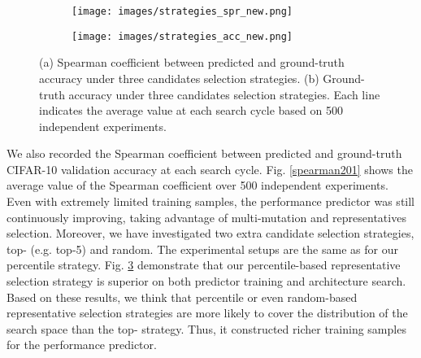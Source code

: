 \documentclass[sigconf]{acmart}
\begin{document}
\begin{figure}[!h]
\begin{subfigure}{.45\textwidth}
  \centering
  \texttt{[image: images/strategies\_spr\_new.png]}
  \caption{}
  \label{strategy_spr}
  \end{subfigure}
\begin{subfigure}{.45\textwidth}
  \centering
  \texttt{[image: images/strategies\_acc\_new.png]} 
  \caption{}
  \label{strategy_acc}
  \end{subfigure}
\caption{(a) Spearman coefficient between predicted and ground-truth accuracy under three candidates selection strategies. (b) Ground-truth accuracy under three candidates selection strategies. Each line indicates the average value at each search cycle based on 500 independent experiments.
}
\label{strategy_compare}
\end{figure}









We also recorded the Spearman coefficient between predicted and ground-truth CIFAR-10 validation accuracy at each search cycle.  Fig. \ref{spearman201} shows the average value of the Spearman coefficient over 500 independent experiments.  Even with extremely limited training samples, the performance predictor was still continuously improving, taking advantage of multi-mutation and representatives selection.  Moreover, we have investigated two extra candidate selection strategies, top- (e.g. top-5) and random. The experimental setups are the same as for our percentile strategy.  Fig. \ref{strategy_compare} demonstrate that our percentile-based representative selection strategy is superior on both predictor training and architecture search. Based on these results, we think that percentile or even random-based representative selection strategies are more likely to cover the distribution of the search space than the top- strategy. Thus, it constructed richer training samples for the performance predictor.
\end{document}
